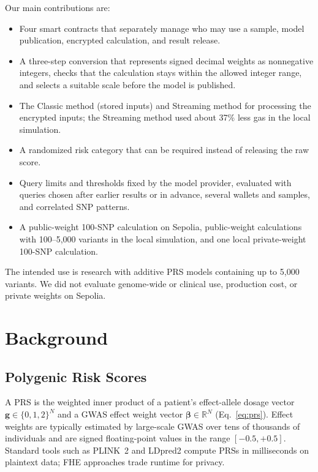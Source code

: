 \documentclass[10pt]{article}
\begin{document}
\smallskip\noindent Our main contributions are:
\begin{itemize}
  \item Four smart contracts that separately manage who may use a sample, model
        publication, encrypted calculation, and result release.
  \item A three-step conversion that represents signed decimal weights as nonnegative
        integers, checks that the calculation stays within the allowed integer range,
        and selects a suitable scale before the model is published.
  \item The Classic method (stored inputs) and Streaming method for processing the encrypted inputs;
        the Streaming method used about 37\% less gas in the local simulation.
  \item A randomized risk category that can be required instead of releasing
        the raw score.
  \item Query limits and thresholds fixed by the model provider, evaluated with queries
        chosen after earlier results or in advance, several wallets and samples, and
        correlated SNP patterns.
  \item A public-weight 100-SNP calculation on Sepolia, public-weight calculations with 100--5,000
        variants in the local simulation, and one local private-weight 100-SNP calculation.
\end{itemize}

The intended use is research with additive PRS models containing up to 5,000 variants.  We did not
evaluate genome-wide or clinical use, production cost, or private weights on Sepolia.

\section{Background}
\label{sec:background}

\subsection{Polygenic Risk Scores}

A PRS is the weighted inner product of a patient's effect-allele dosage vector
$\mathbf{g} \in \{0,1,2\}^N$ and a GWAS effect weight vector $\boldsymbol{\beta}
\in \mathbb{R}^N$ (Eq.~\ref{eq:prs}).  Effect weights are typically estimated by
large-scale GWAS over tens of thousands of individuals and are signed floating-point
values in the range $[-0.5, +0.5]$.  Standard tools such as PLINK~2
\citep{chang2015plink} and LDpred2 \citep{prive2020ldpred2} compute PRSs in
milliseconds on plaintext data; FHE approaches trade runtime for privacy.
\end{document}
